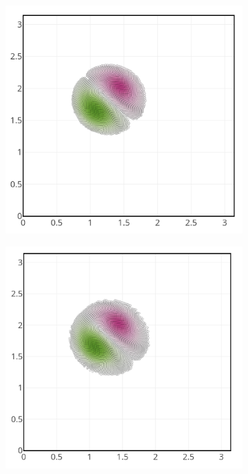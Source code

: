 \begin{figure}[htbp]
    \centering
    \begin{subfigure}{0.3\textwidth}
        \includegraphics[width=\linewidth]{images/app2d/part_eps_0.1.png}
    \end{subfigure}
    \hfill
    \begin{subfigure}{0.3\textwidth}
        \includegraphics[width=\linewidth]{images/app2d/part_eps_0.01.png}

\end{subfigure}
\end{figure}

